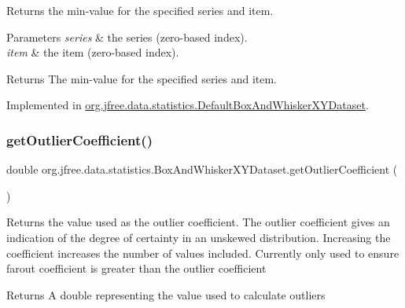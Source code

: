 Returns the min-\/value for the specified series and item.


\begin{DoxyParams}{Parameters}
{\em series} & the series (zero-\/based index). \\
\hline
{\em item} & the item (zero-\/based index).\\
\hline
\end{DoxyParams}
\begin{DoxyReturn}{Returns}
The min-\/value for the specified series and item. 
\end{DoxyReturn}


Implemented in \mbox{\hyperlink{classorg_1_1jfree_1_1data_1_1statistics_1_1_default_box_and_whisker_x_y_dataset_a7104c413a84e5908e40bfa42d931d965}{org.\+jfree.\+data.\+statistics.\+Default\+Box\+And\+Whisker\+X\+Y\+Dataset}}.

\mbox{\label{interfaceorg_1_1jfree_1_1data_1_1statistics_1_1_box_and_whisker_x_y_dataset_a3df6c697a6acb9897a6bd728db18d578}} 
\subsubsection{\texorpdfstring{get\+Outlier\+Coefficient()}{getOutlierCoefficient()}}
{\footnotesize\ttfamily double org.\+jfree.\+data.\+statistics.\+Box\+And\+Whisker\+X\+Y\+Dataset.\+get\+Outlier\+Coefficient (\begin{DoxyParamCaption}{ }\end{DoxyParamCaption})}

Returns the value used as the outlier coefficient. The outlier coefficient gives an indication of the degree of certainty in an unskewed distribution. Increasing the coefficient increases the number of values included. Currently only used to ensure farout coefficient is greater than the outlier coefficient

\begin{DoxyReturn}{Returns}
A {\ttfamily double} representing the value used to calculate outliers 
\end{DoxyReturn}


